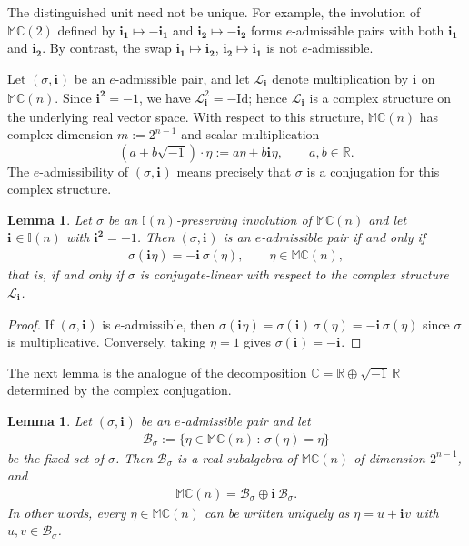 \documentclass[12pt]{amsart}
\theoremstyle{plain}
\newtheorem{lemma}[theorem]{Lemma}
\theoremstyle{definition}
\numberwithin{equation}{section}
\newcommand{\im}[1]{\mathbf{ i_{#1}}}
\newcommand{\ims}[1]{\mathbf{ i_{#1}^2}}
\newcommand{\mC}{\mathbb{C}}
\newcommand{\mR}{\mathbb{R}}
\newcommand{\mM}{\mathbb{M}}
\newcommand{\mI}{\mathbb{I}}
\newcommand{\cL}{\mathcal{L}}
\newcommand{\cB}{\mathcal{B}}
\begin{document}
The distinguished unit need not be unique. For example, the involution of $\mM \mC(2)$ defined by $\im{1}\mapsto-\im{1}$ and $\im{2}\mapsto-\im{2}$ forms $e$-admissible pairs with both $\im{1}$ and $\im{2}$. By contrast, the swap $\im{1}\mapsto\im{2}$, $\im{2}\mapsto\im{1}$ is not $e$-admissible.

Let $(\sigma,\im{})$ be an $e$-admissible pair, and let $\cL_{\im{}}$ denote multiplication by $\im{}$ on $\mM \mC(n)$. Since $\ims{}=-1$, we have $\cL_{\im{}}^2=-\mathrm{Id}$; hence $\cL_{\im{}}$ is a complex structure on the underlying real vector space. With respect to this structure, $\mM \mC(n)$ has complex dimension $m:=2^{n-1}$ and scalar multiplication
\[
(a+b\sqrt{-1})\cdot\eta:=a\eta+b\im{}\eta,
\qquad a,b\in\mR.
\]
The $e$-admissibility of $(\sigma,\im{})$ means precisely that $\sigma$ is a conjugation for this complex structure.

    \begin{lemma}\label{L:Conjugation}
    Let $\sigma$ be an $\mI (n)$-preserving involution of $\mM \mC(n)$ and let $\im{} \in \mI(n)$ with $\ims{} = -1$. Then $(\sigma , \im{})$ is an $e$-admissible pair if and only if
        \begin{align*}
        \sigma ( \im{} \eta ) = - \im{}\, \sigma (\eta) , \qquad \eta \in \mM \mC(n),
        \end{align*}
    that is, if and only if $\sigma$ is conjugate-linear with respect to the complex structure $\cL_{\im{}}$.
    \end{lemma}

    \begin{proof}
    If $(\sigma, \im{})$ is $e$-admissible, then $\sigma (\im{} \eta ) = \sigma (\im{})\, \sigma (\eta ) = - \im{}\, \sigma (\eta )$ since $\sigma$ is multiplicative. Conversely, taking $\eta = 1$ gives $\sigma (\im{}) = -\im{}$.
    \end{proof}

The next lemma is the analogue of the decomposition $\mC = \mR \oplus \sqrt{-1}\, \mR$ determined by the complex conjugation.

    \begin{lemma}\label{L:FixedDecomposition}
    Let $(\sigma , \im{})$ be an $e$-admissible pair and let
        \begin{align*}
        \cB_{\sigma} := \{ \eta \in \mM \mC(n)\, :\, \sigma (\eta ) = \eta \}
        \end{align*}
    be the fixed set of $\sigma$. Then $\cB_\sigma$ is a real subalgebra of $\mM \mC(n)$ of dimension $2^{n-1}$, and
        \begin{align*}
        \mM \mC(n) = \cB_\sigma \oplus \im{}\, \cB_\sigma.
        \end{align*}
    In other words, every $\eta \in \mM \mC(n)$ can be written uniquely as $\eta = u + \im{} v$ with $u , v \in \cB_\sigma$.
    \end{lemma}
\end{document}
